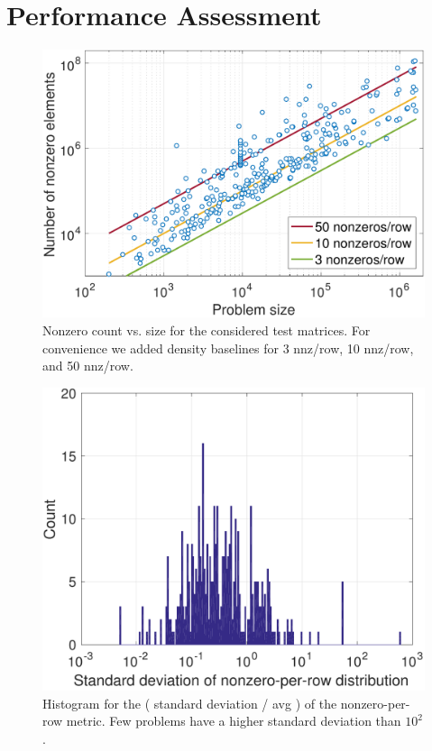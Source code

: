 \section{Performance Assessment}
\label{2017-coo-spmv:s4-experiments}

\begin{figure}
\begin{center}
\includegraphics[width=\columnwidth]{plots/matrixchar_nnz}
\end{center}
\caption{Nonzero count vs. size for the considered test matrices. 
For convenience we added density baselines for 3 nnz/row, 10 nnz/row, and 50 nnz/row.
}
\label{2017-coo-spmv:fig:matrixnnz}
\end{figure}


\begin{figure}
\begin{center}
\includegraphics[width=\columnwidth]{plots/matrixchar_std_avg_logy}
\end{center}
\caption{Histogram for the ( standard deviation / avg ) of the nonzero-per-row metric. Few problems have a higher standard deviation than $10^2$.}
\label{2017-coo-spmv:fig:matrixstd}
\end{figure}

